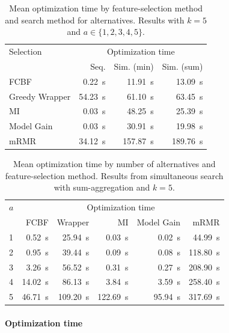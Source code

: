 \documentclass{article}
\theoremstyle{definition}
\begin{document}
\begin{table}[t]
	\centering
	\begin{tabular}{lrrr}
		\toprule
		Selection & \multicolumn{3}{c}{Optimization time} \\
		\cmidrule(r){2-4}
		& Seq. & Sim. (min) & Sim. (sum) \\
		\midrule
		FCBF & 0.22~s & 11.91~s & 13.09~s \\
		Greedy Wrapper & 54.23~s & 61.10~s & 63.45~s \\
		MI & 0.03~s & 48.25~s & 25.39~s \\
		Model Gain & 0.03~s & 30.91~s & 19.98~s \\
		mRMR & 34.12~s & 157.87~s & 189.76~s \\
		\bottomrule
	\end{tabular}
	\caption{
		Mean optimization time by feature-selection method and search method for alternatives.
		Results with $k=5$ and $a \in \{1,2,3,4,5\}$.
	}
	\label{tab:afs:impact-search-fs-method-optimization-time}
\end{table}

\begin{table}[t]
	\centering
	\begin{tabular}{lrrrrr}
		\toprule
		$a$ & \multicolumn{5}{c}{Optimization time} \\
		\cmidrule(r){2-6}
		& FCBF & Wrapper & MI & Model Gain & mRMR \\
		\midrule
		1 & 0.52~s & 25.94~s & 0.03~s & 0.02~s & 44.99~s \\
		2 & 0.95~s & 39.44~s & 0.09~s & 0.08~s & 118.80~s \\
		3 & 3.26~s & 56.52~s & 0.31~s & 0.27~s & 208.90~s \\
		4 & 14.02~s & 86.13~s & 3.84~s & 3.59~s & 258.40~s \\
		5 & 46.71~s & 109.20~s & 122.69~s & 95.94~s & 317.69~s \\
		\bottomrule
	\end{tabular}
	\caption{
		Mean optimization time by number of alternatives and feature-selection method.
		Results from simultaneous search with sum-aggregation and $k=5$.
	}
	\label{tab:afs:impact-num-alternatives-fs-method-optimization-time}
\end{table}

\paragraph{Optimization time}
\end{document}
